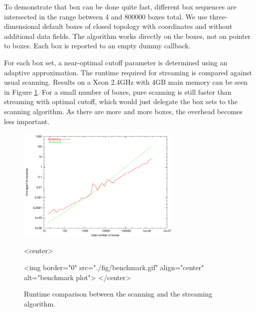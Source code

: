 To demonstrate that box  can be done quite fast, different
box sequences are intersected in the range between 4 and 800000 boxes
total.  We use three-dimensional default boxes of closed topology with
 coordinates and without additional data fields.  The
algorithm works directly on the boxes, not on pointer to boxes. Each
box  is reported to an empty dummy callback.

For each box set, a near-optimal cutoff parameter is determined using
an adaptive approximation. The runtime required for streaming is
compared against usual scanning.  Results on a Xeon 2.4GHz with 4GB
main memory can be seen in Figure \ref{fig_benchmark}. For a small
number of boxes, pure scanning is still faster than streaming with
optimal cutoff, which would just delegate the box sets to the scanning
algorithm. As there are more and more boxes, the overhead becomes less
important. 

\begin{figure}[htbp]
\begin{ccTexOnly}
\begin{center}
  \includegraphics[width=0.7\textwidth]{Box_intersection_d/fig/benchmark}
\end{center}
\end{ccTexOnly}
\begin{ccHtmlOnly}
<center>
\end{ccHtmlOnly}

\begin{ccHtmlOnly}
<img border="0" src="./fig/benchmark.gif" align="center" alt="benchmark plot">
</center>
\end{ccHtmlOnly}

  \caption{Runtime comparison between the scanning and the streaming algorithm.
  \label{fig_benchmark}}
\end{figure}

